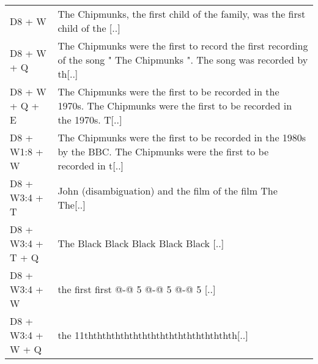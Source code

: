 {\begin{longtable}{@{}l p{\dimexpr\textwidth-3cm-4\tabcolsep}@{}}
D8 + W & The Chipmunks, the first child of the family, was the first child of the [..] \\
D8 + W + Q & The Chipmunks were the first to record the first recording of the song " The Chipmunks ". The song was recorded by th[..] \\
D8 + W + Q + E & The Chipmunks were the first to be recorded in the 1970s. The Chipmunks were the first to be recorded in the 1970s. T[..] \\
D8 + W1:8 + W & The Chipmunks were the first to be recorded in the 1980s by the BBC. The Chipmunks were the first to be recorded in t[..] \\
D8 + W3:4 + T & John (disambiguation) and the film of the film The The[..] \\
D8 + W3:4 + T + Q & The Black Black Black Black Black [..] \\
D8 + W3:4 + W & the first first @-@ 5 @-@ 5 @-@ 5 [..] \\
D8 + W3:4 + W + Q & the 11ththththththththththththththththth[..] \\

\end{longtable}
}
\normalsize